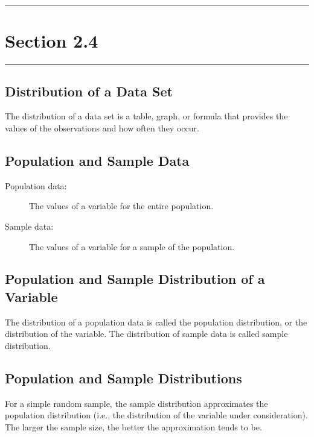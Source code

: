 \documentclass[12pt]{article}
\begin{document}
    \noindent\rule{\textwidth}{0.4pt}
    \section*{Section 2.4}
    \noindent\rule{\textwidth}{0.4pt}
        \subsection*{Distribution of a Data Set}
            The distribution of a data set is a table, graph, or formula that provides the
            values of the observations and how often they occur.
        \subsection*{Population and Sample Data}
            \begin{description}
                \item[Population data:] The values of a variable for the entire population.
                \item[Sample data:] The values of a variable for a sample of the population. 
            \end{description}
        \subsection*{Population and Sample Distribution of a Variable}
            The distribution of a population data is called the population distribution, or
            the distribution of the variable. The distribution of sample data is called
            sample distribution.
        \subsection*{Population and Sample Distributions}
            For a simple random sample, the sample distribution approximates the population
            distribution (i.e., the distribution of the variable under consideration). The
            larger the sample size, the better the approximation tends to be.
    
\end{document}
